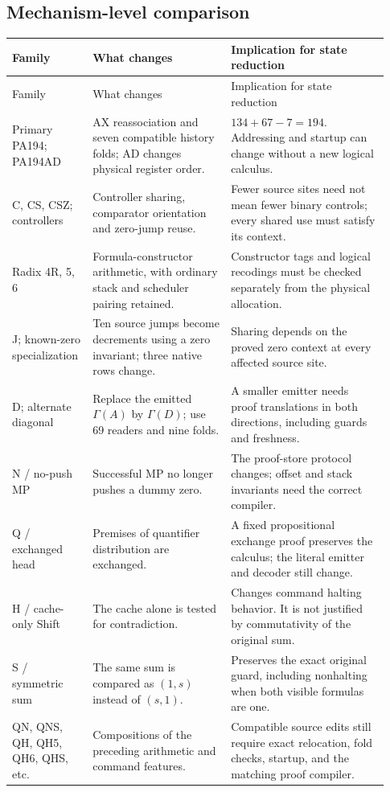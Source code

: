 \documentclass[11pt,letterpaper]{article}
\begin{document}
\subsection{Mechanism-level comparison}
\begin{longtable}{@{}p{0.18\linewidth}p{0.35\linewidth}p{0.40\linewidth}@{}}
\toprule Family & What changes & Implication for state reduction\\\midrule\endfirsthead
\toprule Family & What changes & Implication for state reduction\\\midrule\endhead
Primary PA194; PA194AD & AX reassociation and seven compatible history folds; AD changes physical register order. & $134+67-7=194$. Addressing and startup can change without a new logical calculus.\\
C, CS, CSZ; controllers & Controller sharing, comparator orientation and zero-jump reuse. & Fewer source sites need not mean fewer binary controls; every shared use must satisfy its context.\\
Radix 4R, 5, 6 & Formula-constructor arithmetic, with ordinary stack and scheduler pairing retained. & Constructor tags and logical recodings must be checked separately from the physical allocation.\\
J; known-zero specialization & Ten source jumps become decrements using a zero invariant; three native rows change. & Sharing depends on the proved zero context at every affected source site.\\
D; alternate diagonal & Replace the emitted $\Gamma(A)$ by $\Gamma(D)$; use 69 readers and nine folds. & A smaller emitter needs proof translations in both directions, including guards and freshness.\\
N / no-push MP & Successful MP no longer pushes a dummy zero. & The proof-store protocol changes; offset and stack invariants need the correct compiler.\\
Q / exchanged head & Premises of quantifier distribution are exchanged. & A fixed propositional exchange proof preserves the calculus; the literal emitter and decoder still change.\\
H / cache-only Shift & The cache alone is tested for contradiction. & Changes command halting behavior. It is not justified by commutativity of the original sum.\\
S / symmetric sum & The same sum is compared as $(1,s)$ instead of $(s,1)$. & Preserves the exact original guard, including nonhalting when both visible formulas are one.\\
QN, QNS, QH, QH5, QH6, QHS, etc. & Compositions of the preceding arithmetic and command features. & Compatible source edits still require exact relocation, fold checks, startup, and the matching proof compiler.\\

\end{longtable}
\end{document}
